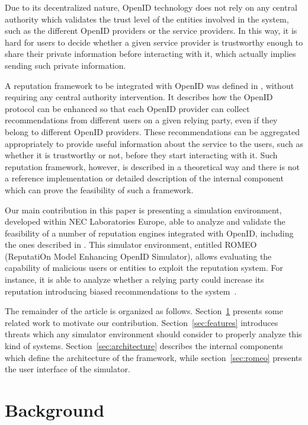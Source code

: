 \documentclass{llncs}
\begin{document}
Due to its decentralized nature, OpenID technology does not rely on any central authority which validates the trust level of the entities involved in the system, such as the different OpenID providers or the service providers. In this way, it is hard for users to decide whether a given service provider is trustworthy enough to share their private information before interacting with it, which actually implies sending such private information.

A reputation framework to be integrated with OpenID was defined in \cite{idm-trm:2011:gomez-marmol:atc}, without requiring any central authority intervention. It describes how the OpenID protocol can be enhanced so that each OpenID provider can collect recommendations from different users on a given relying party, even if they belong to different OpenID providers. These recommendations can be aggregated appropriately to provide useful information about the service to the users, such as whether it is trustworthy or not, before they start interacting with it. Such reputation framework, however, is described in a theoretical way and there is not a reference implementation or detailed description of the internal component which can prove the feasibility of such a framework. 



Our main contribution in this paper is presenting a simulation environment, developed within NEC Laboratories Europe, able to analyze and validate the feasibility of a number of reputation engines integrated with OpenID, including the ones described in \cite{idm-trm:2011:gomez-marmol:atc}. This simulator environment, entitled ROMEO (ReputatiOn Model Enhancing OpenID Simulator), allows evaluating the capability of malicious users or entities to exploit the reputation system. For instance, it is able to analyze whether a relying party could increase its reputation introducing biased recommendations to the system~\cite{trt:2009:gomez-marmol:cose}.

The remainder of the article is organized as follows. Section~\ref{sec:background} presents some related work to motivate our contribution. Section~\ref{sec:features} introduces threats which any simulator environment should consider to properly analyze this kind of systems. Section~\ref{sec:architecture} describes the internal components which define the architecture of the framework, while section~\ref{sec:romeo} presents the user interface of the simulator.

\section{Background}\label{sec:background}
\end{document}
